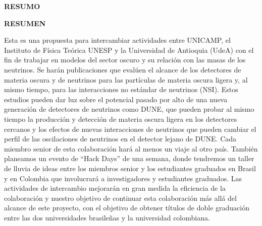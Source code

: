 \documentclass[a4paper,10pt,epsfig,epsf,amsfonts,amsmath]{article}
\begin{document}
\vspace{1cm}

{\bf RESUMO}\\


\vspace{1cm}

{\bf RESUMEN}\\

\begin{ideas}
    
{Esta es una propuesta para intercambiar actividades entre UNICAMP, el Instituto de Física Teórica UNESP y la Universidad de Antioquia (UdeA) con el fin de trabajar en modelos del sector oscuro y su relación con las masas de los neutrinos. 
Se harán publicaciones que evalúen el alcance de los detectores de materia oscura y de neutrinos para las partículas de materia oscura ligera y, al mismo tiempo, para las interacciones no estándar de neutrinos (NSI). 
Estos estudios pueden dar luz sobre el potencial pasado por alto de una nueva generación de detectores de neutrinos como DUNE, que pueden probar al mismo tiempo la producción y detección de materia oscura ligera en los detectores cercanos y los efectos de nuevas interacciones de neutrinos que pueden cambiar el perfil de las oscilaciones de neutrinos en el detector lejano de DUNE. 
Cada miembro senior de esta colaboración hará al menos un viaje al otro país. También planeamos un evento de ``Hack Days'' de una semana, donde tendremos un taller de lluvia de ideas entre los miembros senior y los estudiantes graduados en Brasil y en Colombia que involucrará a investigadores  y estudiantes graduados. 
Las actividades de intercambio mejorarán en gran medida la eficiencia de la colaboración y nuestro objetivo de continuar esta colaboración más allá del alcance de este proyecto, con el objetivo de obtener títulos de doble graduación entre las dos universidades brasileñas y la universidad colombiana.
}
\end{ideas}




\end{document}

